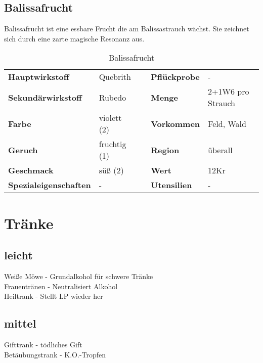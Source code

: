 \subsection{Balissafrucht}

Balissafrucht ist eine essbare Frucht die am Balissastrauch wächst. Sie zeichnet sich durch eine zarte magische Resonanz aus. 

\begin{table}[h]
\begin{center}
\begin{tabular}{|l|l|p{1cm}|l|l|}
	\cline{1-2} \cline{4-5}
	\textbf{Hauptwirkstoff} & Quebrith && \textbf{Pflückprobe} & - \\ \cline{1-2} \cline{4-5}
	\textbf{Sekundärwirkstoff} & Rubedo && \textbf{Menge} & 2+1W6 pro Strauch \\ \cline{1-2} \cline{4-5}
	\textbf{Farbe} & violett (2) && \textbf{Vorkommen} & Feld, Wald \\ \cline{1-2} \cline{4-5}
	\textbf{Geruch} & fruchtig (1) && \textbf{Region} & überall \\ \cline{1-2} \cline{4-5}
	\textbf{Geschmack} & süß (2) && \textbf{Wert} & 12Kr \\ \cline{1-2} \cline{4-5}
	\textbf{Spezialeigenschaften} & - && \textbf{Utensilien} & - \\ \cline{1-2} \cline{4-5}
\end{tabular}
\end{center}
\caption{Balissafrucht}
\label{tab:balissafrucht}
\end{table}

\section{Tränke}
\label{chap:traenke}
\subsection{leicht}
Weiße Möwe - Grundalkohol für schwere Tränke \\
Frauentränen - Neutralisiert Alkohol \\
Heiltrank - Stellt LP wieder her \\

\subsection{mittel}
Gifttrank - tödliches Gift \\
Betäubungstrank - K.O.-Tropfen \\

